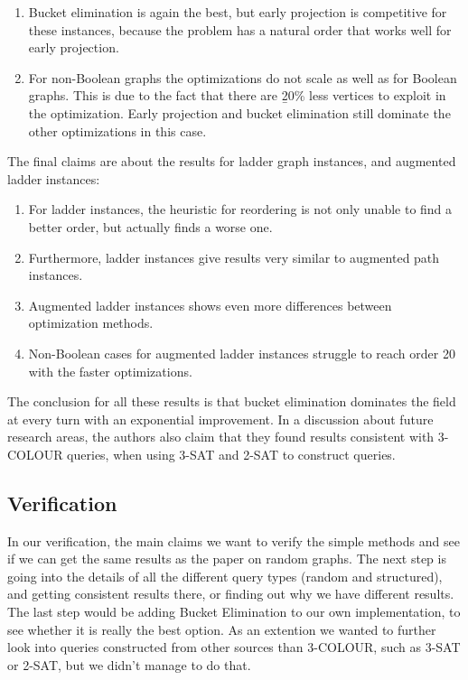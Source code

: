 \begin{enumerate}[resume]
	\item \label{claim:AugBucketDom} Bucket elimination is again the best, but early projection is competitive for these instances, because the problem has a natural order that works well for early projection.
	\item \label{claim:AugNonBool} For non-Boolean graphs the optimizations do not scale as well as for Boolean graphs. This is due to the fact that there are {\b 20\% less vertices to exploit in the optimization}. Early projection and bucket elimination still dominate the other optimizations in this case.
\end{enumerate}

\noindent The final claims are about the results for ladder graph instances, and augmented ladder instances:
\begin{enumerate}[resume]
	\item \label{claim:AugLadReordering} For ladder instances, the heuristic for reordering is not only unable to find a better order, but actually finds a worse one.
	\item \label{claim:AugLadSimilar} Furthermore, ladder instances give results very similar to augmented path instances.
	\item \label{claim:AugLadMoreDiff} Augmented ladder instances shows even more differences between optimization methods.
	\item \label{claim:AugLadNonBool} Non-Boolean cases for augmented ladder instances struggle to reach order 20 with the faster optimizations.
\end{enumerate}

\noindent The conclusion for all these results is that bucket elimination dominates the field at every turn with an exponential improvement. In a discussion about future research areas, the authors also claim that they found results consistent with 3-COLOUR queries, when using 3-SAT and 2-SAT to construct queries.

\subsection{Verification}
In our verification, the main claims we want to verify the simple methods and see if we can get the same results as the paper on random graphs. The next step is going into the details of all the different query types (random and structured), and getting consistent results there, or finding out why we have different results. The last step would be adding Bucket Elimination to our own implementation, to see whether it is really the best option. As an extention we wanted to further look into queries constructed from other sources than 3-COLOUR, such as 3-SAT or 2-SAT, but we didn't manage to do that.